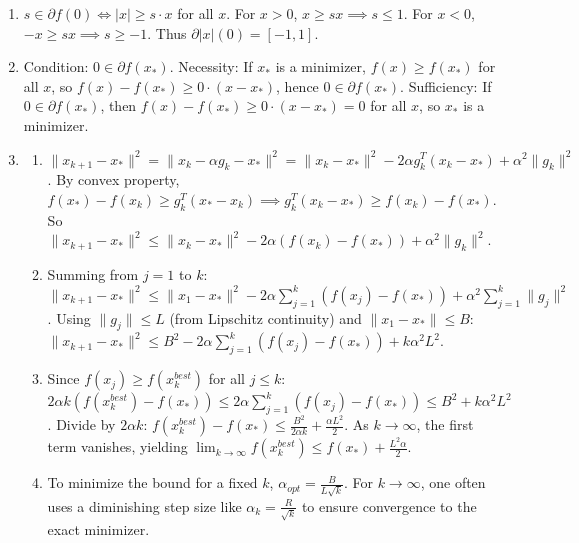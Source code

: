 \begin{solution}
\begin{enumerate}
    \item $s \in \partial f(0) \iff |x| \geq s \cdot x$ for all $x$. 
    For $x > 0$, $x \geq sx \implies s \leq 1$. For $x < 0$, $-x \geq sx \implies s \geq -1$.
    Thus $\partial |x| (0) = [-1, 1]$.
    \item Condition: $0 \in \partial f(x_*)$.
    Necessity: If $x_*$ is a minimizer, $f(x) \geq f(x_*)$ for all $x$, so $f(x) - f(x_*) \geq 0 \cdot (x - x_*)$, hence $0 \in \partial f(x_*)$.
    Sufficiency: If $0 \in \partial f(x_*)$, then $f(x) - f(x_*) \geq 0 \cdot (x - x_*) = 0$ for all $x$, so $x_*$ is a minimizer.
    \item 
    \begin{enumerate}
        \item $\|x_{k+1}-x_*\|^2 = \|x_k - \alpha g_k - x_*\|^2 = \|x_k-x_*\|^2 - 2\alpha g_k^T(x_k-x_*) + \alpha^2 \|g_k\|^2$.
        By convex property, $f(x_*) - f(x_k) \geq g_k^T(x_* - x_k) \implies g_k^T(x_k-x_*) \geq f(x_k) - f(x_*)$.
        So $\|x_{k+1}-x_*\|^2 \leq \|x_k-x_*\|^2 - 2\alpha(f(x_k) - f(x_*)) + \alpha^2 \|g_k\|^2$.
        \item Summing from $j=1$ to $k$:
        $\|x_{k+1}-x_*\|^2 \leq \|x_1-x_*\|^2 - 2\alpha \sum_{j=1}^k (f(x_j) - f(x_*)) + \alpha^2 \sum_{j=1}^k \|g_j\|^2$.
        Using $\|g_j\| \leq L$ (from Lipschitz continuity) and $\|x_1-x_*\| \leq B$:
        $\|x_{k+1}-x_*\|^2 \leq B^2 - 2\alpha \sum_{j=1}^k (f(x_j) - f(x_*)) + k \alpha^2 L^2$.
        \item Since $f(x_j) \geq f(x_k^{best})$ for all $j \leq k$:
        $2\alpha k (f(x_k^{best}) - f(x_*)) \leq 2\alpha \sum_{j=1}^k (f(x_j) - f(x_*)) \leq B^2 + k \alpha^2 L^2$.
        Divide by $2\alpha k$: $f(x_k^{best}) - f(x_*) \leq \frac{B^2}{2\alpha k} + \frac{\alpha L^2}{2}$.
        As $k \to \infty$, the first term vanishes, yielding $\lim_{k \to \infty} f(x_k^{best}) \leq f(x_*) + \frac{L^2 \alpha}{2}$.
        \item To minimize the bound for a fixed $k$, $\alpha_{opt} = \frac{B}{L\sqrt{k}}$. For $k \to \infty$, one often uses a diminishing step size like $\alpha_k = \frac{R}{\sqrt{k}}$ to ensure convergence to the exact minimizer.
    \end{enumerate}
\end{enumerate}
\end{solution}
